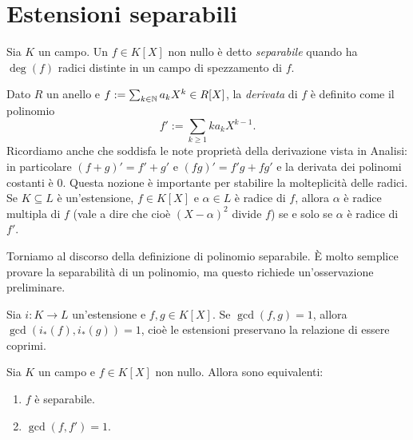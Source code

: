 
\section{Estensioni separabili}

\begin{defi}
Sia \(K\) un campo. Un \(f \in K[X]\) non nullo è detto {\em separabile} quando ha \(\deg(f)\) radici distinte in un campo di spezzamento di \(f\).
\end{defi}

\begin{rich}
Dato \(R\) un anello e \(f := \sum_{k \in \mathbb{N}} a_kX^k \in R[X]\), la {\em derivata} di \(f\) è definito come il polinomio
\[f' := \sum_{k \ge 1} ka_kX^{k-1} .\] 
Ricordiamo anche che soddisfa le note proprietà della derivazione vista in Analisi: in particolare \((f+g)' = f'+g'\) e \((fg)' = f'g + fg'\) e la derivata dei polinomi costanti è \(0\).\newline
Questa nozione è importante per stabilire la molteplicità delle radici. Se \(K \subseteq L\) è un'estensione, \(f \in K[X]\) e \(\alpha \in L\) è radice di \(f\), allora \(\alpha\) è radice multipla di \(f\) (vale a dire che cioè \((X-\alpha)^2\) divide \(f\)) se e solo se \(\alpha\) è radice di \(f'\).
\end{rich}

Torniamo al discorso della definizione di polinomio separabile. È molto semplice provare la separabilità di un polinomio, ma questo richiede un'osservazione preliminare.

\begin{osse}
Sia \(i : K \to L\) un'estensione e \(f, g \in K[X]\). Se \(\gcd(f, g) = 1\), allora \(\gcd\left(i_\ast(f), i_\ast(g)\right) = 1\), cioè le estensioni preservano la relazione di essere coprimi.
\end{osse}

\begin{lemm}\label{lemm:PolinomiSeparabili}
Sia \(K\) un campo e \(f \in K[X]\) non nullo. Allora sono equivalenti:
\begin{enumerate}
\item \(f\) è separabile.
\item \(\gcd(f, f') = 1\).
\end{enumerate}
\end{lemm}

